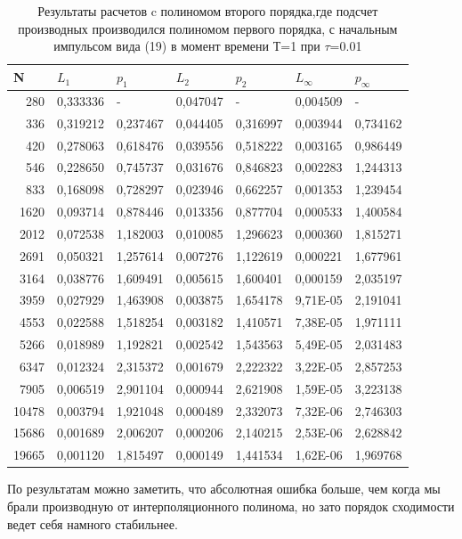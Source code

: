 \documentclass[14pt]{article}
\begin{document}
\begin{table}[H]
\caption{Результаты расчетов c полиномом второго порядка,где подсчет производных производился полиномом первого порядка, с начальным импульсом вида (19) в момент времени Т=1 при $\tau$=0.01}
\begin{tabular}{|r|l|l|l|l|l|l|}
\hline
\multicolumn{1}{|l|}{N} & \multicolumn{1}{l|}{$L_1$}        & \multicolumn{1}{l|}{$p_1$} & \multicolumn{1}{l|}{$L_2$}     & \multicolumn{1}{l|}{$p_2$} & \multicolumn{1}{l|}{$L_\infty$} & \multicolumn{1}{l|}{$p_\infty$} \\ \hline
280                     & 0,333336 & -        & 0,047047 & -        & 0,004509 & -        \\ \hline
336                     & 0,319212 & 0,237467 & 0,044405 & 0,316997 & 0,003944 & 0,734162 \\ \hline
420                     & 0,278063 & 0,618476 & 0,039556 & 0,518222 & 0,003165 & 0,986449 \\ \hline
546                     & 0,228650 & 0,745737 & 0,031676 & 0,846823 & 0,002283 & 1,244313 \\ \hline
833                     & 0,168098 & 0,728297 & 0,023946 & 0,662257 & 0,001353 & 1,239454 \\ \hline
1620                    & 0,093714 & 0,878446 & 0,013356 & 0,877704 & 0,000533 & 1,400584 \\ \hline
2012                    & 0,072538 & 1,182003 & 0,010085 & 1,296623 & 0,000360 & 1,815271 \\ \hline
2691                    & 0,050321 & 1,257614 & 0,007276 & 1,122619 & 0,000221 & 1,677961 \\ \hline
3164                    & 0,038776 & 1,609491 & 0,005615 & 1,600401 & 0,000159 & 2,035197 \\ \hline
3959                    & 0,027929 & 1,463908 & 0,003875 & 1,654178 & 9,71E-05 & 2,191041 \\ \hline
4553                    & 0,022588 & 1,518254 & 0,003182 & 1,410571 & 7,38E-05 & 1,971111 \\ \hline
5266                    & 0,018989 & 1,192821 & 0,002542 & 1,543563 & 5,49E-05 & 2,031483 \\ \hline
6347                    & 0,012324 & 2,315372 & 0,001679 & 2,222322 & 3,22E-05 & 2,857253 \\ \hline
7905                    & 0,006519 & 2,901104 & 0,000944 & 2,621908 & 1,59E-05 & 3,223138 \\ \hline
10478                   & 0,003794 & 1,921048 & 0,000489 & 2,332073 & 7,32E-06 & 2,746303 \\ \hline
15686                   & 0,001689 & 2,006207 & 0,000206 & 2,140215 & 2,53E-06 & 2,628842 \\ \hline
19665                   & 0,001120 & 1,815497 & 0,000149 & 1,441534 & 1,62E-06 & 1,969768 \\ \hline
\end{tabular}
\end{table}
По результатам можно заметить, что абсолютная ошибка больше, чем когда мы брали производную от интерполяционного полинома, но зато порядок сходимости ведет себя намного стабильнее.
\end{document}
